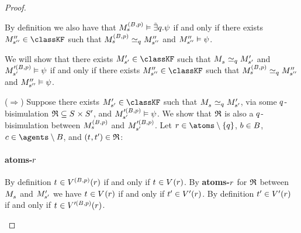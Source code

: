 \begin{proof}
\begin{description}
        By definition we also have that $\kPModel[(\agentsB, \atomP)]{\kStateS} \entails \somebisimsQ \psi$ if and only if there exists $\kPModelPP{\kStateSPP} \in \classKF$ such that $\kPModel[(\agentsB, \atomP)]{\kStateS} \bisimilar[\atomQ] \kPModelPP{\kStateSPP}$ and $\kPModelPP{\kStateSPP} \entails \psi$.

        We will show that there exists $\kPModelP{\kStateSP} \in \classKF$ such that $\kPModel{\kStateS} \bisimilar[\atomQ] \kPModelP{\kStateSP}$ and $\kPModel[\prime(\agentsB, \atomP)]{\kStateSP} \entails \psi$ if and only if there exists $\kPModelPP{\kStateSPP} \in \classKF$ such that $\kPModel[(\agentsB, \atomP)]{\kStateS} \bisimilar[\atomQ] \kPModelPP{\kStateSPP}$ and $\kPModelPP{\kStateSPP} \entails \psi$.

        ($\Rightarrow$)
        Suppose there exists $\kPModelP{\kStateSP} \in \classKF$ such that $\kPModel{\kStateS} \bisimilar[\atomQ] \kPModelP{\kStateSP}$, via some $\atomQ$-bisimulation $\bisimulation \subseteq \kStates \times \kStatesP$, and $\kPModel[\prime(\agentsB, \atomP)]{\kStateSP} \entails \psi$.
        We show that $\bisimulation$ is also a $\atomQ$-bisimulation between $\kPModel[(\agentsB, \atomP)]{\kStateS}$ and $\kPModel[\prime(\agentsB, \atomP)]{\kStateSP}$.
        Let $\atomR \in \atoms \setminus \{\atomQ\}$, $\agentB \in \agentsB$, $\agentC \in \agents \setminus \agentsB$, and $(\kStateT, \kStateTP) \in \refinement$:

        \paragraph{atoms-$\atomR$}
        By definition $\kStateT \in \kValuation[(\agentsB, \atomP)](\atomR)$ if and only if $\kStateT \in \kValuation(\atomR)$.
        By {\bf atoms-$\atomR$} for $\bisimulation$ between $\kPModel{\kStateS}$ and $\kPModelP{\kStateSP}$ we have $\kStateT \in \kValuation(\atomR)$ if and only if $\kStateTP \in \kValuationP(\atomR)$.
        By definition $\kStateTP \in \kValuationP(\atomR)$ if and only if $\kStateT \in \kValuation[\prime(\agentsB, \atomP)](\atomR)$.


\end{description}
\end{proof}
